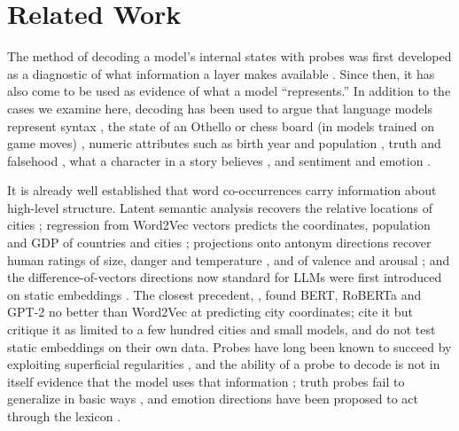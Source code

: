 \documentclass[11pt]{article}
\begin{document}
\section{Related Work}
\label{sec:related}
The method of decoding a model's internal states with probes was first  developed as a diagnostic of what information a layer makes available
\citep{alain2016understanding, conneau2018you, belinkov2022probing}. Since then, it has also come to be used as evidence of what a model ``represents.'' In addition to the cases we examine here, decoding has been used to argue that language models represent syntax \citep{hewitt2019structural}, the state of an Othello or chess board (in models trained on game moves) \citep{li2023emergent, nanda2023emergent,
karvonen2024emergent}, numeric attributes such as birth year and population \citep{heinzerling2024monotonic}, truth and falsehood
\citep{burns2023discovering, azaria2023internal, marks2024geometry}, what a character in a story believes \citep{zhu2024language}, and
sentiment and emotion \citep{tigges2023linear, zou2023representation, sun2026valence}.

It is already well established that word co-occurrences carry information about high-level structure. Latent semantic analysis recovers the relative locations of cities \citep{louwerse2009language}; regression from Word2Vec vectors predicts the coordinates, population and GDP of countries and cities \citep{gupta2015distributional, konkol2017geographical}; projections onto antonym directions recover human ratings of size, danger and temperature \citep{grand2022semantic}, and of valence and arousal \citep{hollis2017extrapolating}; and the difference-of-vectors directions now standard for LLMs were first introduced on static embeddings \citep{mikolov2013linguistic, bolukbasi2016man, kozlowski2019geometry}. The closest precedent, \citet{lietard2021rome}, found BERT, RoBERTa and GPT-2 no better than Word2Vec at predicting city coordinates; \citet{gurnee2024language} cite it but critique it as limited to a few hundred cities and small models, and do not test static embeddings on their own data. Probes have long been known to succeed by exploiting superficial regularities \citep{hewitt2019designing}, and the ability of a probe to decode is not in itself evidence that the model uses that information \citep{ravichander2021probing, elazar2021amnesic, belinkov2022probing}; truth probes fail to generalize in basic ways \citep{levinstein2024still, farquhar2023challenges}, and emotion directions have been proposed to act through the lexicon \citep{sun2026valence}.
\end{document}
